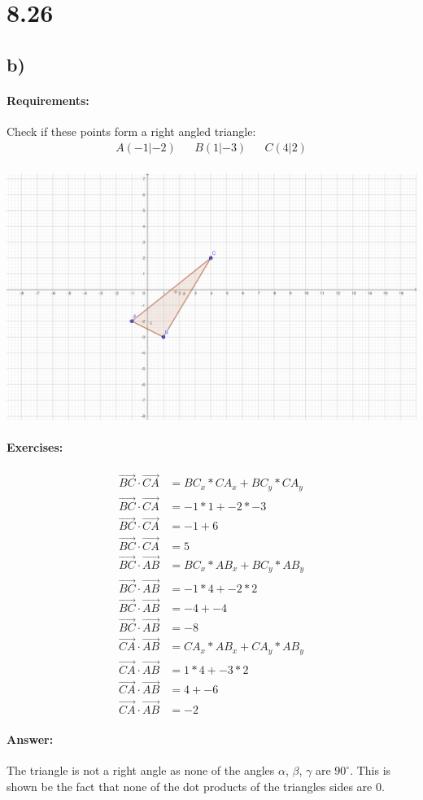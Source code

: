 \section{8.26}
\subsection{b)}
\paragraph{Requirements:}
Check if these points form a right angled triangle:
\begin{align*}
    A(-1|-2) &&
    B(1|-3) &&
    C(4|2) \\[20pt]
\end{align*}

\includegraphics[width=\linewidth]{images/8-26-b.png}

\paragraph{Exercises:}
\begin{align}
    \vec{BC} \cdot \vec{CA} &= BC_x * CA_x + BC_y * CA_y \\
    \vec{BC} \cdot \vec{CA} &= -1 * 1 + -2 * -3 \\
    \vec{BC} \cdot \vec{CA} &= -1 + 6 \\
    \vec{BC} \cdot \vec{CA} &= 5 \\[20pt]
    \vec{BC} \cdot \vec{AB} &= BC_x * AB_x + BC_y * AB_y \\
    \vec{BC} \cdot \vec{AB} &= -1 * 4 + -2 * 2 \\
    \vec{BC} \cdot \vec{AB} &= -4 + -4 \\
    \vec{BC} \cdot \vec{AB} &= -8 \\[20pt]
    \vec{CA} \cdot \vec{AB} &= CA_x * AB_x + CA_y * AB_y \\
    \vec{CA} \cdot \vec{AB} &= 1 * 4 + -3 * 2 \\
    \vec{CA} \cdot \vec{AB} &= 4 + -6 \\
    \vec{CA} \cdot \vec{AB} &= -2
\end{align}

\paragraph{Answer:}
The triangle is not a right angle as none of the angles $\alpha$, $\beta$, $\gamma$ are $90^\circ$.
This is shown be the fact that none of the dot products of the triangles sides are 0.
